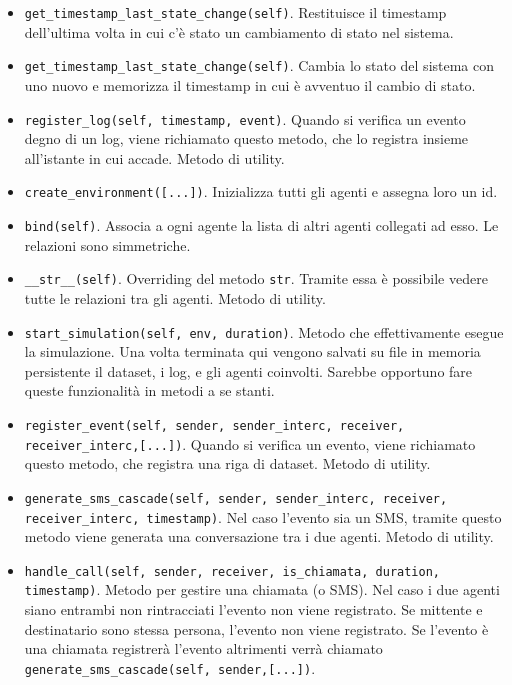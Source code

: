 \documentclass{article}
\begin{document}
\begin{itemize}
    \item \texttt{get_timestamp_last_state_change(self)}. Restituisce il timestamp dell'ultima volta in cui c'è stato un cambiamento di stato nel sistema.
    
    \item \texttt{get_timestamp_last_state_change(self)}. Cambia lo stato del sistema con uno nuovo e memorizza il timestamp in cui è avventuo il cambio di stato.
    
    \item \texttt{register_log(self, timestamp, event)}. Quando si verifica un evento degno di un log, viene richiamato questo metodo, che lo registra insieme all'istante in cui accade. Metodo di utility.
    
    \item \texttt{create_environment([...])}. Inizializza tutti gli agenti e assegna loro un id.
    
    \item \texttt{bind(self)}. Associa a ogni agente la lista di altri agenti collegati ad esso. Le relazioni sono simmetriche.
    
    \item \texttt{__str__(self)}. Overriding del metodo \texttt{str}. Tramite essa è possibile vedere tutte le relazioni tra gli agenti. Metodo di utility.
    
    \item \texttt{start_simulation(self, env, duration)}. Metodo che effettivamente esegue la simulazione. Una volta terminata qui vengono salvati su file in memoria persistente il dataset, i log, e gli agenti coinvolti. Sarebbe opportuno fare queste funzionalità in metodi a se stanti.
    
    \item \texttt{register_event(self, sender, sender_interc, receiver, receiver_interc,[...])}. Quando si verifica un evento, viene richiamato questo metodo, che registra una riga di dataset. Metodo di utility.
    
    \item \texttt{generate_sms_cascade(self, sender, sender_interc, receiver, receiver_interc, timestamp)}. Nel caso l'evento sia un SMS, tramite questo metodo viene generata una conversazione tra i due agenti. Metodo di utility.
    
    \item \texttt{handle_call(self, sender, receiver, is_chiamata, duration, timestamp)}. Metodo per gestire una chiamata (o SMS). Nel caso i due agenti siano entrambi non rintracciati l'evento non viene registrato. Se mittente e destinatario sono stessa persona, l'evento non viene registrato. Se l'evento è una chiamata registrerà l'evento altrimenti verrà chiamato \texttt{generate_sms_cascade(self, sender,[...])}.
    

\end{itemize}
\end{document}
